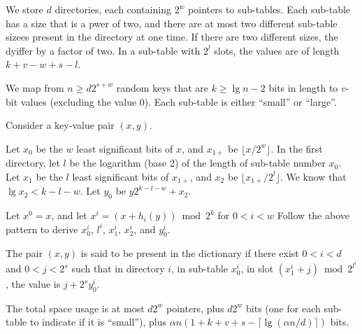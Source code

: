 \documentclass[11pt,letterpaper]{article}
\begin{document}
We store $d$ directories, each containing $2^w$ pointers to sub-tables.
Each sub-table has a size that is a pwer of two, and there are at most two different sub-table sizees present in the directory at one time.
If there are two different sizes, the dyiffer by a factor of two.
In a sub-table with $2^l$ slots, the values are of length $k + v - w + s - l$.

We map from $n \geq d 2^{s+w}$ random keys that are $k \geq \lg n - 2$ bits in length to $v$-bit values (excluding the value $0$).
Each sub-table is either ``small'' or ``large''.


Consider a key-value pair $(x,y)$.

Let $x_0$ be the $w$ least significant bits of $x$, and $x_{1+}$ be $\lfloor x / 2^w \rfloor$.
In the first directory, let $l$ be the logarithm (base 2) of the length of sub-table number $x_0$.
Let $x_1$ be the $l$ least significant bits of $x_{1+}$, and $x_2$ be $\lfloor x_{1+} / 2^l \rfloor$.
We know that $\lg x_2 < k - l - w$.
Let $y_0$ be $y 2^{k - l - w} + x_2$.

Let $x^0 = x$, and let $x^i = (x + h_i(y)) \bmod 2^k$ for $0 < i < w$
Follow the above pattern to derive $x^i_0$, $l^i$, $x^i_1$, $x^i_2$, and $y^i_0$.

The pair $(x,y)$ is said to be present in the dictionary if there exist $0 < i < d$ and $0 < j < 2^s$ such that in directory $i$, in sub-table $x^i_0$, in slot $(x^i_1 + j) \bmod 2^{l^i}$, the value is $j + 2^s y^i_0$.

The total space usage is at most $d 2^w$ pointers, plus $d 2^w$ bits (one for each sub-table to indicate if it is ``small''), plus $\alpha n (1 + k + v + s - \lceil \lg (\alpha n / d) \rceil)$ bits.

\end{document}
